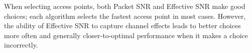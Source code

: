  When selecting access points, both Packet SNR and Effective SNR make good choices; each algorithm selects the fastest access point in most cases. However, the ability of Effective SNR to capture channel effects leads to better choices more often and generally closer-to-optimal performance when it makes a choice incorrectly.


